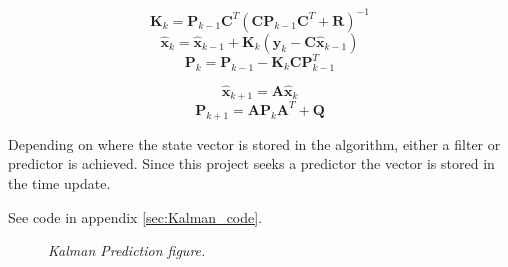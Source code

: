$$
\textbf{K}_{k} = \textbf{P}_{k-1}\textbf{C}^T(\textbf{C}\textbf{P}_{k-1}\textbf{C}^T + \textbf{R})^{-1}
$$
$$
\hat{\textbf{x}}_k = \hat{\textbf{x}}_{k-1} + \textbf{K}_k (\textbf{y}_k - \textbf{C}\hat{\textbf{x}}_{k-1})
$$
$$
\textbf{P}_k = \textbf{P}_{k-1} - \textbf{K}_k\textbf{C}\textbf{P}_{k-1}^T
$$

$$
\hat{\textbf{x}}_{k+1} = \textbf{A}\hat{\textbf{x}}_{k}
$$
$$
\textbf{P}_{k+1} = \textbf{A}\textbf{P}_{k}\textbf{A}^T + \textbf{Q}
$$

Depending on where the state vector is stored in the algorithm, either a filter or predictor is achieved. Since this project seeks a predictor the vector is stored in the time update.
 
See code in appendix \ref{sec:Kalman_code}. %

\begin{figure}[htb]
	\centering
	\caption{\textit{Kalman Prediction figure.}}
	\label{fig:kalman_fig} %
\end{figure}